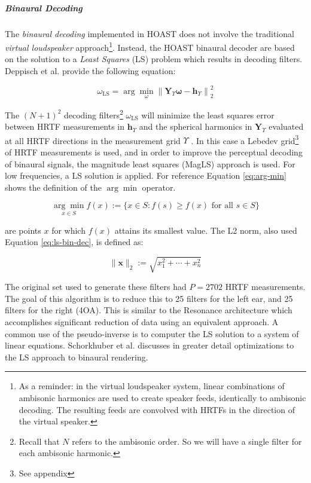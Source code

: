 \subparagraph{Binaural Decoding}

The \textit{binaural decoding} implemented in HOAST does not involve the traditional \textit{virtual loudspeaker} approach\footnote{As a reminder: in the virtual loudspeaker system, linear combinations of ambisonic harmonics are used to create speaker feeds, identically to ambisonic decoding. The resulting feeds are convolved with HRTFs in the direction of the virtual speaker.}. Instead, the HOAST binaural decoder are based on the solution to a \textit{Least Squares} (LS) problem which results in decoding filters. Deppisch et al. provide the following equation:

\begin{equation}
\omega_{\mathrm{LS}}=\arg \min _{\omega}\left\|\boldsymbol{Y}_{\Upsilon} \boldsymbol{\omega}-\boldsymbol{h}_{\Upsilon}\right\|_{2}^{2}
\label{eq:ls-bin-dec}
\end{equation}

The $(N+1)^2$ decoding filters\footnote{Recall that $N$ refers to the ambisonic order. So we will have a single filter for each ambisonic harmonic.} $\omega_{\mathrm{LS}}$ will minimize the least squares error between HRTF measurements in $\boldsymbol{h}_{\Upsilon}$ and the spherical harmonics in $\boldsymbol{Y}_{\Upsilon}$ evaluated at all HRTF directions in the measurement grid $\Upsilon$ \cite{deppisch2020hoast}. In this case a Lebedev grid\footnote{See appendix} of HRTF measurements is used, and in order to improve the perceptual decoding of binaural signals, the magnitude least squares (MagLS) approach is used. For low frequencies, a LS solution is applied. For reference Equation \ref{eq:arg-min} shows the definition of the $\arg \min$ operator. 

\begin{equation}
\underset{x \in S}{\arg \min } f(x):=\{x \in S: f(s) \geq f(x) \text { for all } s \in S\}
\label{eq:arg-min}
\end{equation}

are points $x$ for which $f(x)$ attains its smallest value. The L2 norm, also used Equation \ref{eq:ls-bin-dec}, is defined as:

\begin{equation}
\|\boldsymbol{x}\|_{2}:=\sqrt{x_{1}^{2}+\cdots+x_{n}^{2}}
\end{equation}

The original set used to generate these filters had $P=2702$ HRTF measurements. The goal of this algorithm is to reduce this to 25 filters for the left ear, and 25 filters for the right (4OA). This is similar to the Resonance architecture \cite{gorzel2019efficient} which accomplishes significant reduction of data using an equivalent approach. A common use of the pseudo-inverse is to computer the LS solution to a system of linear equations. Schorkhuber et al. \cite{schorkhuber2018binaural} discusses in greater detail optimizations to the LS approach to binaural rendering. 

